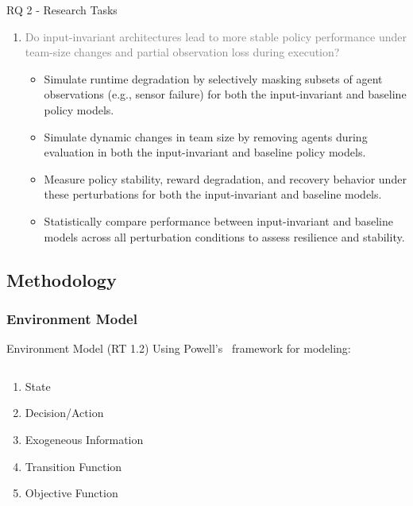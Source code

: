 \begin{frame}{RQ 2 - Research Tasks}
    \begin{enumerate}
        \item[RQ 2] \textcolor{gray}{
            Do input-invariant architectures lead to more stable policy performance under 
            team-size changes and partial observation loss during execution? } \vspace{1em}
    \begin{itemize}
        \item[RT 2.1] {
            Simulate runtime degradation by selectively masking subsets of agent observations 
            (e.g., sensor failure) for both the input-invariant and baseline policy models.}
        \item[RT 2.2] {
            Simulate dynamic changes in team size by removing agents during evaluation 
            in both the input-invariant and baseline policy models.}
        \item[RT 2.3] {
            Measure policy stability, reward degradation, and recovery behavior under these 
            perturbations for both the input-invariant and baseline models.}
        \item[RT 2.4] {
            Statistically compare performance between input-invariant and baseline models 
            across all perturbation conditions to assess resilience and stability.}
    \end{itemize}
    \end{enumerate}
\end{frame}

\subsection{Methodology}

\subsubsection{Environment Model}

\begin{frame}{Environment Model (RT 1.2)}
    Using Powell's~\cite{powell2022}
    framework for modeling:
    \begin{columns}
        \begin{column}{0.3\linewidth}
            \begin{enumerate}
                \item State
                \item Decision/Action
                \item Exogeneous Information
                \item Transition Function
                \item Objective Function
            \end{enumerate}
        \end{column}
        \begin{column}{0.7\linewidth}
        \end{column}
    \end{columns}
\end{frame}

